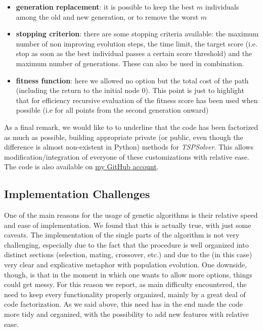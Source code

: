 \documentclass{article}
\begin{document}
\begin{itemize}
\item \textbf{generation replacement}: it is possible to keep the best $m$ individuals among the old and new generation, or to remove the worst $m$

\item \textbf{stopping criterion}: there are some stopping criteria available: the maximum number of non improving evolution steps, the time limit, the target score (i.e. stop as soon as the best individual passes a certain score threshold) and the maximum number of generations. These can also be used in combination.

\item \textbf{fitness function}: here we allowed no option but the total cost of the path (including the return to the initial node 0). This point is just to highlight that for efficiency recursive evaluation of the fitness score has been used when possible (i.e for all points from the second generation onward)
\end{itemize}
As a final remark, we would like to to underline that the code has been factorized as much as possible, building appropriate private (or public, even though the difference is almost non-existent in Python) methods for \textit{TSPSolver}. This allows modification/integration of everyone of these customizations with relative ease. The code is also available on \href{https://github.com/NRuggeriProjects/Combinatorial-Optimization}{my GitHub account}.

\subsection{Implementation Challenges}
One of the main reasons for the usage of genetic algorithms is their relative speed and ease of implementation. We found that this is actually true, with just some caveats. The implementation of the single parts of the algorithm is not very challenging, especially due to the fact that the procedure is well organized into distinct sections (selection, mating, crossover, etc.) and due to the (in this case) very clear and explicative metaphor with population evolution. One downside, though, is that in the moment in which one wants to allow more options, things could get messy. For this reason we report, as main difficulty encountered, the need to keep every functionality properly organized, mainly by a great deal of code factorization. As we said above, this need has in the end made the code more tidy and organized, with the possibility to add new features with relative ease.
\end{document}
